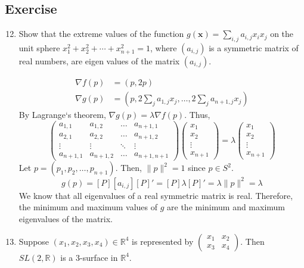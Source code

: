 \subsection*{Exercise}
\begin{enumerate}
	\setcounter{enumi}{11}
	\item Show that the extreme values of the function $g(\boldsymbol{x}) = \sum_{i,j} a_{i,j} x_i x_j$ on the unit sphere $x_1^2 + x_2^2 + \dotsb + x_{n+1}^2 = 1$, where $(a_{i,j})$ is a symmetric matrix of real numbers, are eigen values of the matrix $(a_{i,j})$.
	\begin{important}
		\begin{align*}
			\nabla f(p) & = (p,2p) \\
			\nabla g(p) & = (p,2\sum_j a_{1,j}x_j,\dots,2\sum_j a_{n+1,j} x_j) 
		\end{align*}
		By Lagrange`s theorem, $\nabla g(p) = \lambda \nabla f(p)$. Thus,
		$$ \begin{pmatrix} a_{1,1} & a_{1,2} & \dots & a_{n+1,1} \\ a_{2,1} & a_{2,2} & \dots & a_{n+1,2} \\ \vdots & \vdots & \ddots & \vdots \\ a_{n+1,1} & a_{n+1,2} & \dots & a_{n+1,n+1} \end{pmatrix} \begin{pmatrix} x_1 \\ x_2 \\ \vdots \\ x_{n+1} \end{pmatrix} = \lambda \begin{pmatrix} x_1 \\ x_2 \\ \vdots \\ x_{n+1} \end{pmatrix}  $$
	Let $p = (p_1,p_2,\dots,p_{n+1})$. Then, $\|p\|^2 = 1$ since $p \in S^2$.
	$$ g(p) = [P][a_{i,j}][P]' = [P]\lambda[P]' = \lambda \|p\|^2 = \lambda $$
	We know that all eigenvalues of a real symmetric matrix is real. 
	Therefore, the minimum and maximum values of $g$ are the minimum and maximum eigenvalues of the matrix.
	\end{important}
	\setcounter{enumi}{14}
	\item Suppose $(x_1,x_2,x_3,x_4) \in \mathbb{R}^4$ is represented by $\begin{pmatrix} x_1 & x_2 \\ x_3 & x_4 \end{pmatrix}$. Then $SL(2,\mathbb{R})$ is a $3$-surface in $\mathbb{R}^4$.\\


\end{enumerate}

